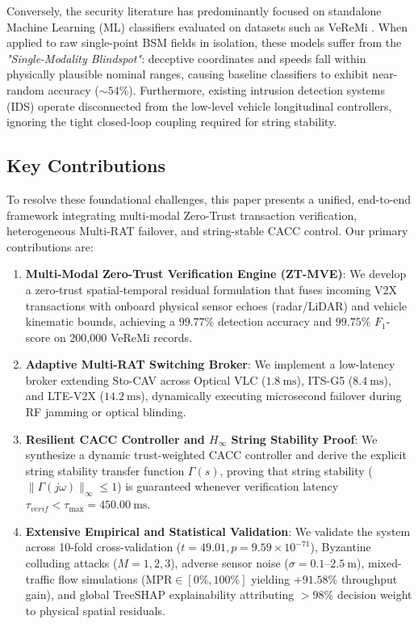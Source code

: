 \documentclass[journal]{IEEEtran}
\begin{document}
Conversely, the security literature has predominantly focused on standalone Machine Learning (ML) classifiers evaluated on datasets such as VeReMi \cite{vanderheijden2018veremi, kamel2020misbehavior}. When applied to raw single-point BSM fields in isolation, these models suffer from the \textit{"Single-Modality Blindspot"}: deceptive coordinates and speeds fall within physically plausible nominal ranges, causing baseline classifiers to exhibit near-random accuracy ($\sim 54\%$). Furthermore, existing intrusion detection systems (IDS) operate disconnected from the low-level vehicle longitudinal controllers, ignoring the tight closed-loop coupling required for string stability.

\subsection{Key Contributions}
To resolve these foundational challenges, this paper presents a unified, end-to-end framework integrating multi-modal Zero-Trust transaction verification, heterogeneous Multi-RAT failover, and string-stable CACC control. Our primary contributions are:
\begin{enumerate}
    \item \textbf{Multi-Modal Zero-Trust Verification Engine (ZT-MVE)}: We develop a zero-trust spatial-temporal residual formulation that fuses incoming V2X transactions with onboard physical sensor echoes (radar/LiDAR) and vehicle kinematic bounds, achieving a $99.77\%$ detection accuracy and $99.75\%$ $F_1$-score on 200,000 VeReMi records.
    \item \textbf{Adaptive Multi-RAT Switching Broker}: We implement a low-latency broker extending Sto-CAV across Optical VLC ($1.8~\text{ms}$), ITS-G5 ($8.4~\text{ms}$), and LTE-V2X ($14.2~\text{ms}$), dynamically executing microsecond failover during RF jamming or optical blinding.
    \item \textbf{Resilient CACC Controller and $H_\infty$ String Stability Proof}: We synthesize a dynamic trust-weighted CACC controller and derive the explicit string stability transfer function $\Gamma(s)$, proving that string stability ($\|\Gamma(j\omega)\|_\infty \le 1$) is guaranteed whenever verification latency $\tau_{verif} < \tau_{\max} = 450.00~\text{ms}$.
    \item \textbf{Extensive Empirical and Statistical Validation}: We validate the system across 10-fold cross-validation ($t = 49.01, p = 9.59 \times 10^{-71}$), Byzantine colluding attacks ($M=1,2,3$), adverse sensor noise ($\sigma = 0.1\text{--}2.5~\text{m}$), mixed-traffic flow simulations ($\text{MPR} \in [0\%, 100\%]$ yielding $+91.58\%$ throughput gain), and global TreeSHAP explainability attributing $>98\%$ decision weight to physical spatial residuals.
\end{enumerate}
\end{document}

